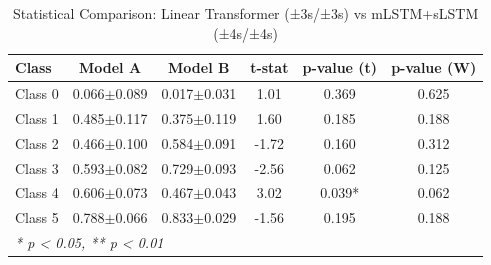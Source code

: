 \begin{table}[htbp]
\centering
\caption{Statistical Comparison: Linear Transformer (±3s/±3s) vs mLSTM+sLSTM (±4s/±4s)}
\label{tab:comparison_class_linear_transformer_±3s_±3s_vs_mlstmslstm_±4s_±4s}
\begin{tabular}{lccccc}
\toprule
\textbf{Class} & \textbf{Model A} & \textbf{Model B} & \textbf{t-stat} & \textbf{p-value (t)} & \textbf{p-value (W)} \\
\midrule
Class 0 & 0.066$\pm$0.089 & 0.017$\pm$0.031 & 1.01 & 0.369 & 0.625 \\
Class 1 & 0.485$\pm$0.117 & 0.375$\pm$0.119 & 1.60 & 0.185 & 0.188 \\
Class 2 & 0.466$\pm$0.100 & 0.584$\pm$0.091 & -1.72 & 0.160 & 0.312 \\
Class 3 & 0.593$\pm$0.082 & 0.729$\pm$0.093 & -2.56 & 0.062 & 0.125 \\
Class 4 & 0.606$\pm$0.073 & 0.467$\pm$0.043 & 3.02 & 0.039* & 0.062 \\
Class 5 & 0.788$\pm$0.066 & 0.833$\pm$0.029 & -1.56 & 0.195 & 0.188 \\
\bottomrule
\multicolumn{6}{l}{\textit{* p < 0.05, ** p < 0.01}} \\
\end{tabular}
\end{table}